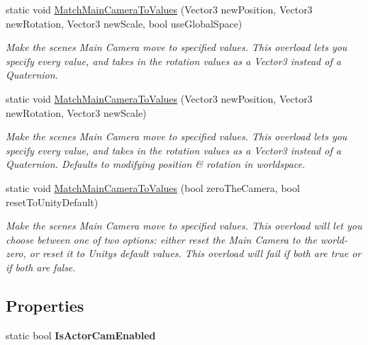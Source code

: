 \begin{DoxyCompactItemize}
static void \mbox{\hyperlink{class_scene_view_actor_camera_ae248bbbefe424aabc56875b4f7bf942d}{Match\+Main\+Camera\+To\+Values}} (Vector3 new\+Position, Vector3 new\+Rotation, Vector3 new\+Scale, bool use\+Global\+Space)
\begin{DoxyCompactList}\small\item\em Make the scene\textquotesingle{}s Main Camera move to specified values. This overload lets you specify every value, and takes in the rotation values as a Vector3 instead of a Quaternion. \end{DoxyCompactList}\item 
static void \mbox{\hyperlink{class_scene_view_actor_camera_a66ac86cd938970082513231063316872}{Match\+Main\+Camera\+To\+Values}} (Vector3 new\+Position, Vector3 new\+Rotation, Vector3 new\+Scale)
\begin{DoxyCompactList}\small\item\em Make the scene\textquotesingle{}s Main Camera move to specified values. This overload lets you specify every value, and takes in the rotation values as a Vector3 instead of a Quaternion. Defaults to modifying position \& rotation in worldspace. \end{DoxyCompactList}\item 
static void \mbox{\hyperlink{class_scene_view_actor_camera_a6803c2185afa5fb555dd64eafdab31b6}{Match\+Main\+Camera\+To\+Values}} (bool zero\+The\+Camera, bool reset\+To\+Unity\+Default)
\begin{DoxyCompactList}\small\item\em Make the scene\textquotesingle{}s Main Camera move to specified values. This overload will let you choose between one of two options\+: either reset the Main Camera to the world-\/zero, or reset it to Unity\textquotesingle{}s default values. This overload will fail if both are true or if both are false. \end{DoxyCompactList}\end{DoxyCompactItemize}
\subsection*{Properties}
\begin{DoxyCompactItemize}
\item 
\mbox{\label{class_scene_view_actor_camera_a0de0dd5d70d8e78328be80c326882725}} 
static bool {\bfseries Is\+Actor\+Cam\+Enabled}
\end{DoxyCompactItemize}


